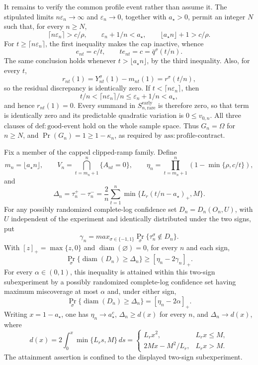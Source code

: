 It remains to verify the common profile event rather than assume it. The stipulated limits \(n\varepsilon_n\to\infty\) and \(\varepsilon_n\to0\), together with \(a_\star>0\), permit an integer \(N\) such that, for every \(n\ge N\),
\[
 \lceil n\varepsilon_n\rceil>c/\rho,
 \qquad
 \varepsilon_n+1/n<a_\star,
 \qquad
 \lfloor a_\star n\rfloor+1>c/\rho.
\]
For \(t\ge\lceil n\varepsilon_n\rceil\), the first inequality makes the cap inactive, whence
\[
 e_{nt}=c/t,
 \qquad
 t e_{nt}=c=\bar q^\sigma(t/n).
\]
The same conclusion holds whenever \(t>\lfloor a_\star n\rfloor\), by the third inequality. Also, for every \(t\),
\[
 r_{nt}(1)=Y_{nt}^\sigma(1)-m_{nt}(1)
 =r^\sigma(t/n),
\]
so the residual discrepancy is identically zero. If \(t<\lceil n\varepsilon_n\rceil\), then
\[
 t/n<\lceil n\varepsilon_n\rceil/n
 \le\varepsilon_n+1/n<a_\star,
\]
and hence \(r_{nt}(1)=0\). Every summand in \(S_{n,\mathrm{rare}}^{\mathrm{early}}\) is therefore zero, so that term is identically zero and its predictable quadratic variation is \(0\le v_{0,n}\). All three clauses of \(\mathrm{def:good\mbox{-}event}\) hold on the whole sample space. Thus \(G_n=\Omega\) for \(n\ge N\), and \(\Pr(G_n)=1\ge1-\kappa_n\), as required by \(\mathrm{ass:profile\mbox{-}contract}\).

Fix a member of the capped clipped-ramp family. Define
\[
 m_n=\lfloor a_\star n\rfloor,
 \qquad
 V_n=\bigcap_{t=m_n+1}^{n}\{A_{nt}=0\},
 \qquad
 \eta_n=\prod_{t=m_n+1}^{n}\left(1-\min\{\rho,c/t\}\right),
\]
and
\[
 \Delta_n=\tau_n^+-\tau_n^-
 =\frac2n\sum_{t=1}^{n}\min\{L_r(t/n-a_\star)_+,M\}.
\]
For any possibly randomized complete-log confidence set \(D_n=D_n(O_n,U)\), with \(U\) independent of the experiment and identically distributed under the two signs, put
\[
 \gamma_n=max_{\sigma\in\{-1,1\}}
 \Pr_\sigma\{\tau_n^\sigma\notin D_n\}.
\]
With \([z]_+=\max\{z,0\}\) and \(\operatorname{diam}(\varnothing)=0\), for every \(n\) and each sign,
\[
 \Pr_\sigma\{\operatorname{diam}(D_n)\ge\Delta_n\}
 \ge[\eta_n-2\gamma_n]_+.
\]
For every \(\alpha\in(0,1)\), this inequality is attained within this two-sign subexperiment by a possibly randomized complete-log confidence set having maximum miscoverage at most \(\alpha\) and, under either sign,
\[
 \Pr_\sigma\{\operatorname{diam}(D_n)\ge\Delta_n\}
 =[\eta_n-2\alpha]_+.
\]
Writing \(x=1-a_\star\), one has \(\eta_n\to a_\star^c\), \(\Delta_n\ge d(x)\) for every \(n\), and \(\Delta_n\to d(x)\), where
\[
 d(x)=2\int_0^x\min\{L_rs,M\}\,ds
 =\begin{cases}
 L_rx^2,&L_rx\le M,\\
 2Mx-M^2/L_r,&L_rx>M.
 \end{cases}
\]
The attainment assertion is confined to the displayed two-sign subexperiment.

